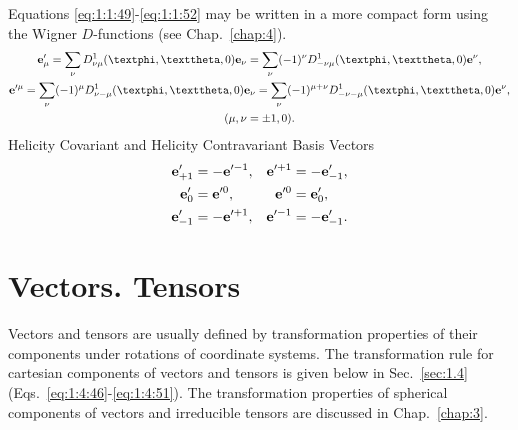 Equations \eqref{eq:1:1:49}-\eqref{eq:1:1:52} may be written in a more compact form using the Wigner \(D\)-functions (see Chap.~\ref{chap:4}).
\begin{gather}
\vect{e}_{\mu}^{\prime}=\sum_{\nu} D_{\nu \mu}^{1}(\varphi, \vartheta, 0) \vect{e}_{\nu}=\sum_{\nu}(-1)^{\nu} D_{-\nu \mu}^{1}(\varphi, \vartheta, 0) \vect{e}^{\nu},  \notag\\
\vect{e}^{\prime \mu}=\sum_{\nu}(-1)^{\mu} D_{\nu-\mu}^{1}(\varphi, \vartheta, 0) \vect{e}_{\nu}=\sum_{\nu}(-1)^{\mu+\nu} D_{-\nu-\mu}^{1}(\varphi, \vartheta, 0) \vect{e}^{\nu},  \label{eq:1:1:53}\\
(\mu, \nu= \pm 1,0) . \notag
\end{gather}
Helicity Covariant and Helicity Contravariant Basis Vectors
\begin{alignat}{2}
\mathbf{e}_{+1}^{\prime} & =-\mathbf{e}^{\prime-1}, & \mathbf{e}^{\prime+1} & =-\mathbf{e}_{-1}^{\prime}  ,\notag\\
\mathbf{e}_{0}^{\prime} & =\mathbf{e}^{\prime 0}, & \mathbf{e}^{\prime 0} & =\mathbf{e}_{0}^{\prime}  ,\label{eq:1:1:54}\\
\mathbf{e}_{-1}^{\prime} & =-\mathbf{e}^{\prime+1}, & \mathbf{e}^{\prime-1} & =-\mathbf{e}_{-1}^{\prime}. \notag
\end{alignat}
\section{Vectors. Tensors}\label{sec:1.2}
Vectors and tensors are usually defined by transformation properties of their components under rotations of coordinate systems. The transformation rule for cartesian components of vectors and tensors is given below in Sec.~\ref{sec:1.4} (Eqs.~\eqref{eq:1:4:46}-\eqref{eq:1:4:51}). The transformation properties of spherical components of vectors and irreducible tensors are discussed in Chap.~\ref{chap:3}.

